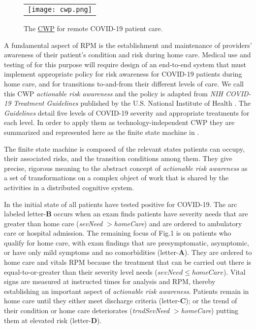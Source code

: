\begin{figure}[t]
  \begin{center}
    \begin{tabular}{c}
      \texttt{[image: cwp.png]}
    \end{tabular}
  \end{center}
\caption{The \href{https://github.com/ericmercer/SPIN-bpmn-cwp-verification-paper/blob/main/26-Oct-2021-CWP.png}{CWP} for remote COVID-19 patient care.}
\label{fig:cwp}
\end{figure}

A fundamental aspect of RPM is the establishment and maintenance of providers' awareness of their patient’s condition and risk during home care.
Medical use and testing of \phware for this purpose will require design of an end-to-end system that must implement appropriate policy for risk awareness for COVID-19 patients during home care, and for transitions to-and-from their different levels of care.
We call this CWP \emph{actionable risk awareness} and the policy is adapted from \emph{NIH COVID-19 Treatment Guidelines} published by the U.S. National Institute of Health \cite{NIH}.
The \emph{Guidelines} detail five levels of COVID-19 severity and appropriate treatments for each level.
In order to apply them as technology-independent CWP they are summarized and represented here as the finite state machine in .

The finite state machine is composed of the relevant states patients can occupy, their associated risks, and the transition conditions among them. They give precise, rigorous meaning to the abstract concept of \emph{actionable risk awareness} as a set of transformations on a complex object of work that is shared by the activities in a distributed cognitive system.

In the initial state of  all patients have tested positive for COVID-19. The arc labeled letter-\textbf{B} occurs when an exam finds patients have severity needs that are greater than home care (\emph{sevNeed $>$homeCare}) and are ordered to ambulatory care or hospital admission.
The remaining focus of Fig.1 is on patients who qualify for home care, with exam findings that are presymptomatic, asymptomic, or have only mild symptoms and no comorbidities (letter-\textbf{A}).
They are ordered to home care and vitals RPM because the treatment that can be carried out there is equal-to-or-greater than their severity level needs (\emph{$sevNeed \le homeCare$}).
Vital signs are measured at instructed times for analysis and RPM, thereby establishing an important aspect of \emph{actionable risk awareness}.
Patients remain in home care until they either meet discharge criteria (letter-\textbf{C}); or the trend of their condition or home care deteriorates  (\emph{trndSevNeed $>$homeCare}) putting them at elevated risk (letter-\textbf{D}).

